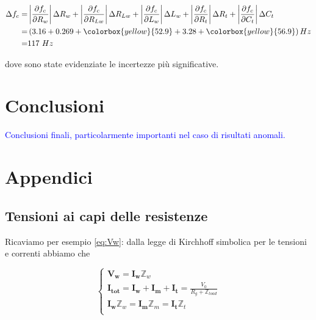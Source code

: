 \documentclass[12pt,italian]{article}
\newcommand{\prof}[1]{\textcolor{blue}{#1}}
\begin{document}
\begin{equation}
  \begin{aligned}
    \Delta f_{c} = & \left|\frac{\partial f_{c}}{\partial R_{w}}\right| \Delta R_{w} + \left|\frac{\partial f_{c}}{\partial R_{Lw}}\right| \Delta R_{Lw} + \left|\frac{\partial f_{c}}{\partial L_{w}}\right| \Delta L_{w} + \left|\frac{\partial f_{c}}{\partial R_{t}}\right| \Delta R_{t} + \left|\frac{\partial f_{c}}{\partial C_{t}}\right| \Delta C_{t} \\
    =              & \left( 3.16 + 0.269 + \colorbox{yellow}{52.9} + 3.28 + \colorbox{yellow}{56.9} \right) Hz                                                                                                                                                                                                                                                 \\
    =              & 117 \ Hz
  \end{aligned}
\end{equation}

\noindent
dove sono state evidenziate le incertezze più significative.

\section*{Conclusioni}
\prof{Conclusioni finali, particolarmente importanti nel caso di risultati
  anomali.}

\appendix
\section{Appendici}
\subsection{Tensioni ai capi delle resistenze}
\label{sec:tensioni}

Ricaviamo per esempio \eqref{eq:Vw}: dalla legge di Kirchhoff simbolica per le
tensioni e correnti abbiamo che

\begin{equation}
  \begin{cases}
    \mathbf{V_{w}} = \mathbf{I_{w}} \mathbb{Z}_{w}                                                                \\
    \mathbf{I_{tot}} = \mathbf{I_{w}} + \mathbf{I_{m}} + \mathbf{I_{t}} = \frac{V_{0}}{R_{g} + \mathbb{Z}_{load}} \\
    \mathbf{I_{w}} \mathbb{Z}_{w} = \mathbf{I_{m}} \mathbb{Z}_{m} = \mathbf{I_{t}} \mathbb{Z}_{t}                 \\
  \end{cases}
\end{equation}
\end{document}
